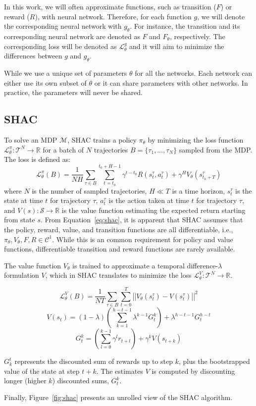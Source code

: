 In this work, we will often approximate functions, such as transition ($F$) or reward ($R$), with neural network. Therefore, for each function $g$, we will denote the corresponding neural network with $g_\theta$. For instance, the transition and its corresponding neural network are denoted as $F$ and $F_{\theta}$, respectively. The corresponding loss will be denoted as $\mathcal{L}_\theta^g$ and it will aim to minimize the differences between $g$ and $g_\theta$.

While we use a unique set of parameters $\theta$ for all the networks. Each network can either use its own subset of $\theta$ or it can share parameters with other networks. In practice, the parameters will never be shared.

\subsection{SHAC}

To solve an MDP $\mathcal{M}$, SHAC trains a policy $\pi_\theta$ by minimizing the loss function $\mathcal{L}_\theta^{\pi}:\mathcal{T}^N\rightarrow\mathbb{R}$ for a batch of $N$ trajectories $B = \{\tau_1, \ldots, \tau_N\}$ sampled from the MDP. The loss is defined as:  
\begin{equation}\label{eq:shac}
    \mathcal{L}_\theta^{\pi}(B) = \frac{1}{NH}\sum_{\tau\in B} \sum_{t=t_0}^{t_0+H-1} \gamma^{t-t_0} R(s_t^\tau, a_t^\tau) + \gamma^H V_\theta(s^\tau_{t_0+T})
\end{equation}
where $N$ is the number of sampled trajectories, $H \ll T$ is a time horizon, $s_t^\tau$ is the state at time $t$ for trajectory $\tau$, $a_t^\tau$ is the action taken at time $t$ for trajectory $\tau$, and $V(s): \mathcal{S} \rightarrow \mathbb{R}$ is the value function estimating the expected return starting from state $s$. From Equation~\ref{eq:shac}, it is apparent that SHAC assumes that the policy, reward, value, and transition functions are all differentiable, i.e., $\pi_\theta,V_\theta,F,R \in \mathcal{C}^1$. While this is an common requirement for policy and value functions, differentiable transition and reward functions are rarely available. 

The value function $V_\theta$ is trained to approximate a temporal difference-$\lambda$ formulation \cite{Sutton98} $V$, which in SHAC translates to minimize the loss $\mathcal{L}_\theta^{V}:\mathcal{T}^N\rightarrow\mathbb{R}$.

$$ \mathcal{L}_\theta^V(B)=\frac{1}{NT}\sum_{\tau\in B}\sum_{t=0}^T\left|\left| V_\theta(s^\tau_t) - V(s^\tau_t) \right|\right|^2 $$
$$ V(s_t) = (1-\lambda) \left(\sum_{k=1}^{h-t-1}\lambda^{k-1}G_t^k\right) + \lambda^{h-t-1}G_t^{h-t}$$
$$ G_t^k = \left(\sum_{l=0}^{k-1}\gamma^l r_{t+l}\right) + \gamma^k V(s_{t+k})$$

$G^t_k$ represents the discounted sum of rewards up to step $k$, plus the bootstrapped value of the state at step $t+k$. The estimates $V$ is computed by discounting longer (higher $k$) discounted sums, $G^k_t$.

Finally, Figure~\ref{fig:shac} presents an unrolled view of the SHAC algorithm.
